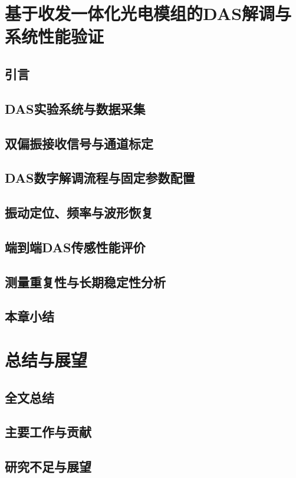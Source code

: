 \chapter{基于收发一体化光电模组的DAS解调与系统性能验证}
\thispagestyle{main}

\section{引言}
\section{DAS实验系统与数据采集}
\section{双偏振接收信号与通道标定}
\section{DAS数字解调流程与固定参数配置}
\section{振动定位、频率与波形恢复}
\section{端到端DAS传感性能评价}
\section{测量重复性与长期稳定性分析}
\section{本章小结}

\chapter{总结与展望}
\thispagestyle{main}

\section{全文总结}
\section{主要工作与贡献}
\section{研究不足与展望}
